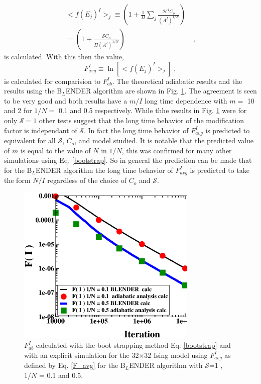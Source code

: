 \documentclass[aps,pre,reprint,superscriptaddress,showkeys]{revtex4-2}
\begin{document}
\begin{equation}
\begin{split}
 <f(E_j)^I>_j  \equiv (1 + \frac{1}{\Pi}\sum_j\frac{\mathcal{H}^IC_o}{(A^I)^{1/N}})\\
 = (1 + \frac{\mathcal{S}C_o}{\Pi(A^I)^{1/N}})& \;,
 \end{split}
 \label{calcmodfactor}
 \end{equation} 
 is calculated. With this then the value,
 \begin{equation}
  F_{avg}^I\equiv \ln[<f(E_j)^I>_j]\;,
  \label{F_avg}
  \end{equation}
  is  calculated for comparision to $F_{ab}^I$.   The theoretical adiabatic results and the results using the B$_L$ENDER algorithm are shown in Fig. \ref{fcalcs}.   The agreement is seen to be very good and both results have a $m/I$ long time dependence with $m=$ 10 and 2  for $1/N=$ 0.1 and 0.5 respectively. While thhe results in Fig. \ref{fcalcs} were for only $\mathcal{S}=1$ other tests suggest that the long time behavior of the modification factor is independant of $\mathcal{S}$. In fact the long time behavior of $F_{avg}^I$ is predicted to equivalent for all $\mathcal{S}$, $C_o$,  and model studied.  It is notable that the predicted value of $m$ is equal to the value of $N$ in $1/N$, this was confirmed for many other simulations using Eq. \ref{bootstrap}. So in general the prediction can be made that for the B$_L$ENDER algorithm the long time behavior of $F_{avg}^I$ is predicted to take the form $N/I$ regardless of the choice of $C_o$ and $\mathcal{S}$. 
\begin{figure}
\includegraphics[width=8.6cm]{Fcalcs.eps}
\caption{$F_{ab}^I$ calculated with the boot strapping method Eq. \ref{bootstrap} and with an explicit simulation for the 32$\times$32 Ising model using $F_{avg}^I$ as defined by Eq. \ref{F_avg} for the B$_L$ENDER algorithm with $\mathcal{S}$=1 , $1/N$ = 0.1  and 0.5.            \label{fcalcs}}
\end{figure}
\end{document}
